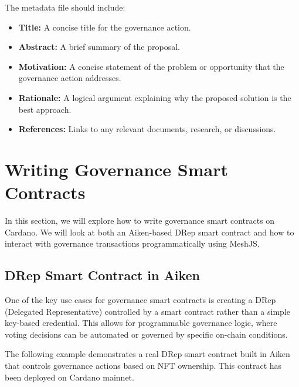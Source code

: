 The metadata file should include:
\begin{itemize}
    \item \textbf{Title:} A concise title for the governance action.
    \item \textbf{Abstract:} A brief summary of the proposal.
    \item \textbf{Motivation:} A concise statement of the problem or opportunity that the governance action addresses.
    \item \textbf{Rationale:} A logical argument explaining why the proposed solution is the best approach.
    \item \textbf{References:} Links to any relevant documents, research, or discussions.
\end{itemize}


\section{Writing Governance Smart Contracts} \label{sec:governance-smart-contracts}

In this section, we will explore how to write governance smart contracts on Cardano. We will look at both an Aiken-based DRep smart contract and how to interact with governance transactions programmatically using MeshJS.

\subsection{DRep Smart Contract in Aiken}

One of the key use cases for governance smart contracts is creating a DRep (Delegated Representative) controlled by a smart contract rather than a simple key-based credential. This allows for programmable governance logic, where voting decisions can be automated or governed by specific on-chain conditions.

The following example demonstrates a real DRep smart contract built in Aiken that controls governance actions based on NFT ownership. This contract has been deployed on Cardano mainnet.

